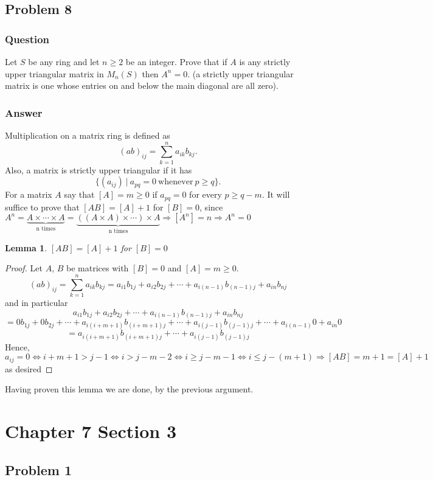 \documentclass[12pt]{article}
\newtheorem{lemma}[theorem]{Lemma}
\begin{document}
\subsection{Problem 8}

\subsubsection{Question}
Let $S$ be any ring and let $n \geq 2$ be an integer. Prove that if $A$ is any strictly upper triangular matrix in $M_n(S)$ then $A^n=0$. (a strictly upper triangular matrix is one whose entries on and below the main diagonal are all zero).
\subsubsection{Answer}
Multiplication on a matrix ring is defined as 
\[(ab)_{ij}=\sum_{k=1}^n a_{ik}b_{kj}.\]
Also, a matrix is strictly upper triangular if it has 
\[\{ (a_{ij})\ | \ a_{pq}=0\ \mathrm{whenever}\ p \geq q\}.\]
For a matrix $A$ say that $[A]=m\geq 0$ if $a_{pq}=0$ for every $p\geq q - m$. It will suffice to prove that $[A B]=[A]+1$ for $[B]=0$, since $A^n = \underbrace {A \times \cdots \times A}_{\textrm{n\ times}} = \underbrace {((A \times A ) \times \cdots) \times A}_{\textrm{n\ times}}  \Rightarrow [A^n]=n \Rightarrow A^n=0$

\begin{lemma}$[A B]=[A]+1$ for $[B]=0$\end{lemma}
\begin{proof}
Let $A$, $B$ be matrices with $[B]=0$ and $[A]=m\geq0$. 
\[(ab)_{ij}=\sum_{k=1}^n a_{ik}b_{kj}= a_{i1}b_{1j}+a_{i 2}b_{2j}+\cdots+a_{i(n-1)}b_{(n-1)j}+a_{i n}b_{n j}\]
and in particular
\[a_{i1}b_{1j}+a_{i 2}b_{2j}+\cdots+a_{i(n-1)}b_{(n-1)j}+a_{i n}b_{n j}\]
\[= 0 b_{1j}+0b_{2j}+\cdots+a_{i(i+m+1)}b_{(i+m+1)j}+\cdots+a_{i(j-1)}b_{(j-1)j}+\cdots+a_{i(n-1)}0+a_{i n}0\]
\[= a_{i(i+m+1)}b_{(i+m+1)j}+\cdots+a_{i(j-1)}b_{(j-1)j}\]
Hence, $a_{ij}=0 \Leftrightarrow i+m+1>j-1\Leftrightarrow i>j-m-2 \Leftrightarrow  i \geq j-m-1 \Leftrightarrow i \leq j - (m+1) \Rightarrow [AB]=m+1=[A]+1$ as desired\end{proof}

Having proven this lemma we are done, by the previous argument.

\section{Chapter 7 Section 3}
\subsection{Problem 1}
\end{document}
